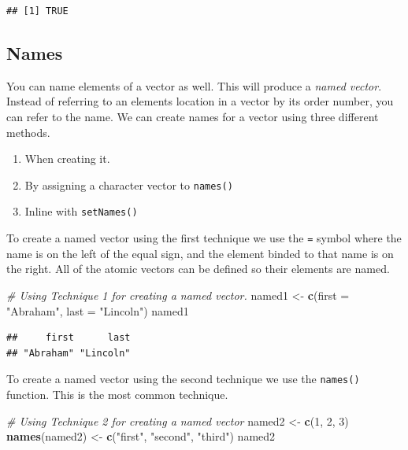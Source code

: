 \documentclass[
]{book}
\newenvironment{Shaded}{\begin{snugshade}}{\end{snugshade}}
\newcommand{\CommentTok}[1]{\textcolor[rgb]{0.56,0.35,0.01}{\textit{#1}}}
\newcommand{\DataTypeTok}[1]{\textcolor[rgb]{0.13,0.29,0.53}{#1}}
\newcommand{\DecValTok}[1]{\textcolor[rgb]{0.00,0.00,0.81}{#1}}
\newcommand{\KeywordTok}[1]{\textcolor[rgb]{0.13,0.29,0.53}{\textbf{#1}}}
\newcommand{\NormalTok}[1]{#1}
\newcommand{\StringTok}[1]{\textcolor[rgb]{0.31,0.60,0.02}{#1}}
\begin{document}
\begin{verbatim}
## [1] TRUE
\end{verbatim}

\hypertarget{names}{%
\subsection{Names}\label{names}}

You can name elements of a vector as well. This will produce a \emph{named vector}. Instead of referring to an elements location in a vector by its order number, you can refer to the name. We can create names for a vector using three different methods.

\begin{enumerate}
\def\labelenumi{\arabic{enumi})}
\item
  When creating it.
\item
  By assigning a character vector to \texttt{names()}
\item
  Inline with \texttt{setNames()}
\end{enumerate}

To create a named vector using the first technique we use the \texttt{=} symbol where the name is on the left of the equal sign, and the element binded to that name is on the right. All of the atomic vectors can be defined so their elements are named.

\begin{Shaded}
\begin{Highlighting}[]
\CommentTok{# Using Technique 1 for creating a named vector.}
\NormalTok{named1 <-}\StringTok{ }\KeywordTok{c}\NormalTok{(}\DataTypeTok{first =} \StringTok{"Abraham"}\NormalTok{, }\DataTypeTok{last =} \StringTok{"Lincoln"}\NormalTok{)}
\NormalTok{named1}
\end{Highlighting}
\end{Shaded}

\begin{verbatim}
##     first      last 
## "Abraham" "Lincoln"
\end{verbatim}

To create a named vector using the second technique we use the \texttt{names()} function. This is the most common technique.

\begin{Shaded}
\begin{Highlighting}[]
\CommentTok{# Using Technique 2 for creating a named vector}
\NormalTok{named2 <-}\StringTok{ }\KeywordTok{c}\NormalTok{(}\DecValTok{1}\NormalTok{, }\DecValTok{2}\NormalTok{, }\DecValTok{3}\NormalTok{)}
\KeywordTok{names}\NormalTok{(named2) <-}\StringTok{ }\KeywordTok{c}\NormalTok{(}\StringTok{"first"}\NormalTok{, }\StringTok{"second"}\NormalTok{, }\StringTok{"third"}\NormalTok{)}
\NormalTok{named2}
\end{Highlighting}
\end{Shaded}
\end{document}
